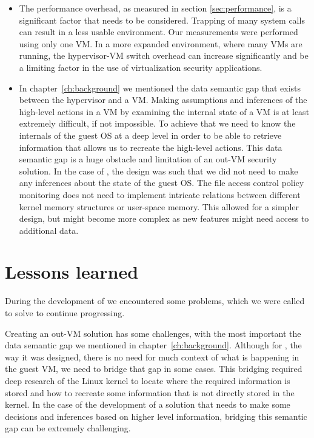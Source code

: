 \begin{itemize}
\item The performance overhead, as measured in section \ref{sec:performance}, is a significant factor that needs to be considered. Trapping of many system calls can result in a less usable environment. Our measurements were performed using only one \ac{VM}. In a more expanded environment, where many \acp{VM} are running, the hypervisor-\ac{VM} switch overhead can increase significantly and be a limiting factor in the use of virtualization security applications.

\item In chapter~\ref{ch:background} we mentioned the data semantic gap that exists between the hypervisor and a \ac{VM}. Making assumptions and inferences of the high-level actions in a \ac{VM} by examining the internal state of a \ac{VM} is at least extremely difficult, if not impossible. To achieve that we need to know the internals of the guest \ac{OS} at a deep level in order to be able to retrieve information that allows us to recreate the high-level actions. This data semantic gap is a huge obstacle and limitation of an out-\ac{VM} security solution. In the case of , the design was such that we did not need to make any inferences about the state of the guest \ac{OS}. The file access control policy monitoring does not need to implement intricate relations between different kernel memory structures or user-space memory. This allowed for a simpler design, but might become more complex as new features might need access to additional data.
 
\end{itemize} 


\section{Lessons learned}

\par During the development of  we encountered some problems, which we were called to solve to continue progressing.  

\par Creating an out-\ac{VM} solution has some challenges, with the most important the data semantic gap we mentioned in chapter~\ref{ch:background}. Although for , the way it was designed, there is no need for much context of what is happening in the guest \ac{VM}, we need to bridge that gap in some cases. This bridging required deep research of the Linux kernel to locate where the required information is stored and how to recreate some information that is not directly stored in the kernel. In the case of the development of a solution that needs to make some decisions and inferences based on higher level information, bridging this semantic gap can be extremely challenging.

